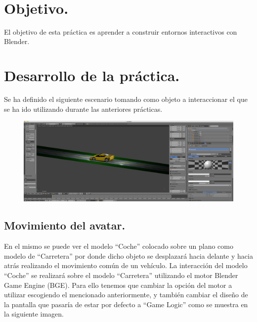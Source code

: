 \documentclass[10pt]{article}
\begin{document}
\begin{center}
 		\\																		%
\vspace{2cm} 																				
\begin{center}																					

 			\end{center}												  						
\end{center}							 											
																					
\newpage																		

\tableofcontents 

\newpage

\section{Objetivo.}
El objetivo de esta práctica es aprender a construir entornos interactivos con Blender.


\section{Desarrollo de la práctica.}
Se ha definido el siguiente escenario tomando como objeto a interaccionar el que se ha ido utilizando durante las anteriores prácticas. \\

\begin{figure}[H]
	\begin{center}
	 		\includegraphics[width = 1.00\textwidth]{Imagenes/p4-img1}
	\end{center} 
\end{figure}


\subsection{Movimiento del avatar.}
En el mismo se puede ver el modelo ``Coche'' colocado sobre un plano como modelo de ``Carretera'' por donde dicho objeto se desplazará hacia delante y hacia atrás realizando el movimiento común de un vehículo. La interacción del modelo ``Coche'' se realizará sobre el modelo ``Carretera'' utilizando el motor Blender Game Engine (BGE).  Para ello tenemos que cambiar la opción del motor a utilizar escogiendo el mencionado anteriormente, y también cambiar el diseño de la pantalla que pasaría de estar por defecto a ``Game Logic'' como se muestra en la siguiente imagen. \\
\end{document}
